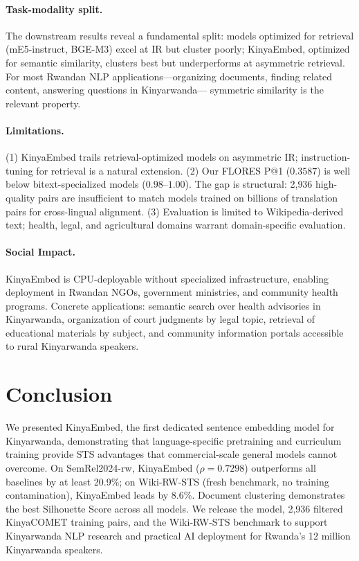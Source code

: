 \documentclass[letterpaper]{article} %
\begin{document}
\paragraph{Task-modality split.}
The downstream results reveal a fundamental split: models optimized for
retrieval (mE5-instruct, BGE-M3) excel at IR but cluster poorly; KinyaEmbed,
optimized for semantic similarity, clusters best but underperforms at
asymmetric retrieval. For most Rwandan NLP applications---organizing
documents, finding related content, answering questions in Kinyarwanda---
symmetric similarity is the relevant property.

\paragraph{Limitations.}
(1) KinyaEmbed trails retrieval-optimized models on asymmetric IR;
instruction-tuning for retrieval is a natural extension.
(2) Our FLORES P@1 ($0.3587$) is well below bitext-specialized models
($0.98$--$1.00$). The gap is structural: 2{,}936 high-quality pairs are
insufficient to match models trained on billions of translation pairs for
cross-lingual alignment.
(3) Evaluation is limited to Wikipedia-derived text; health, legal, and
agricultural domains warrant domain-specific evaluation.

\paragraph{Social Impact.}
KinyaEmbed is CPU-deployable without specialized infrastructure, enabling
deployment in Rwandan NGOs, government ministries, and community health
programs. Concrete applications: semantic search over health advisories in
Kinyarwanda, organization of court judgments by legal topic, retrieval of
educational materials by subject, and community information portals accessible
to rural Kinyarwanda speakers.

\section{Conclusion}

We presented KinyaEmbed, the first dedicated sentence embedding model for
Kinyarwanda, demonstrating that language-specific pretraining and curriculum
training provide STS advantages that commercial-scale general models cannot
overcome. On SemRel2024-rw, KinyaEmbed ($\rho = 0.7298$) outperforms all
baselines by at least 20.9\%; on Wiki-RW-STS (fresh benchmark, no training
contamination), KinyaEmbed leads by 8.6\%. Document clustering demonstrates
the best Silhouette Score across all models. We release the model, 2{,}936
filtered KinyaCOMET training pairs, and the Wiki-RW-STS benchmark to support
Kinyarwanda NLP research and practical AI deployment for Rwanda's 12 million
Kinyarwanda speakers.
\end{document}
